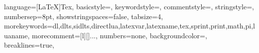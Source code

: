 
 {language={[LaTeX]Tex},
basicstyle=\small\ttfamily,             %
keywordstyle=\color{RoyalBlue},%
commentstyle=\color{Green}\ttfamily,
stringstyle=\rmfamily,
numbersep=8pt,
showstringspaces=false,
	tabsize=4,                              %
	morekeywords={dl,dlts,sidlts,directlua,latexvar,latexname,tex,sprint,print,math,pi,luaname},
	morecomment=[l][\color{Blue}]{...},     %
	numbers=none,                           %
	backgroundcolor=\color{orange!8},
	breaklines=true,
}

